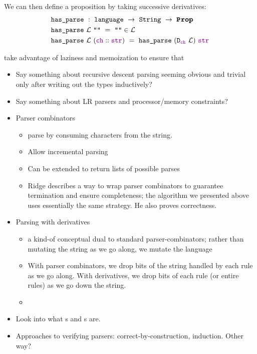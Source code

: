      We can then define a  proposition by taking successive derivatives:
\begin{align*}
&\fname{has\_parse}~:~\coqtype{language}~\to~\coqtype{String}~\to~\Prop \\
&\fname{has\_parse}~\mathcal{L}~\str{}~=~\str{}\in\mathcal{L} \\
&\fname{has\_parse}~\mathcal{L}~(\cons{\farg{ch}}{\farg{str}})~=~\fname{has\_parse}~(\fname{D\ensuremath{_{\farg{ch}}}}~\mathcal L)~\farg{str} \\
\end{align*}
      
      
       take advantage of laziness and memoization to ensure that 
      
  
  \begin{itemize}
    \item Say something about recursive descent parsing seeming obvious and trivial only after writing out the types inductively?
    \item Say something about LR parsers and processor/memory constraints?
    \item Parser combinators
      \begin{itemize}
        \item parse by consuming characters from the string.
        \item Allow incremental parsing
        \item Can be extended to return lists of possible parses
        \item Ridge describes a way to wrap parser combinators to guarantee termination and ensure completeness; the algorithm we presented above uses essentially the same strategy.  He also proves correctness.
      \end{itemize}
    \item Parsing with derivatives
      \begin{itemize}
        \item a kind-of conceptual dual to standard parser-combinators; rather than mutating the string as we go along, we mutate the language
        \item With parser combinators, we drop bits of the string handled by each rule as we go along.  With derivatives, we drop bits of each rule (or entire rules) as we go down the string.
        \item {}
      \end{itemize}
    \item Look into what \cite{PEG}s and \cite{GLL}s are.
    \item Approaches to verifying parsers: correct-by-construction, induction.  Other way?  
  \end{itemize}

